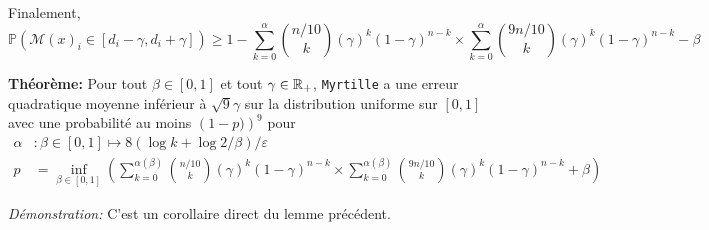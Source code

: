 Finalement,
\[
    \mathbb P\left(  \mathcal M(x)_i \in [d_i - \gamma, d_i + \gamma] \right) \geq 1 - \sum_{k = 0}^{\alpha} \binom{n/10}{k}\left( \gamma \right)^k (1 - \gamma)^{n-k} \times \sum_{k = 0}^{\alpha} \binom{9n/10}{k}\left( \gamma \right)^k (1 - \gamma)^{n-k} - \beta  
\]


\vspace*{5pt}
\textbf{Théorème: } Pour tout \(\beta \in [0,1]\) et tout \(\gamma \in \mathbb{R}_+\), \texttt{Myrtille} a une erreur quadratique moyenne inférieur à \(\sqrt{9}\gamma\) sur la distribution uniforme sur \([0,1]\) avec une probabilité au moins \(\left( 1 - p) \right)^9\) pour 
\begin{align*}
    \alpha & : \beta \in [0,1] \mapsto  8\left( \log k + \log 2/\beta \right)/\varepsilon\\
    p & = \inf_{\beta \in [0,1]}\left( \sum_{k = 0}^{\alpha(\beta)} \binom{n/10}{k}\left( \gamma \right)^k (1 - \gamma)^{n-k} \times \sum_{k = 0}^{\alpha(\beta)} \binom{9n/10}{k}\left( \gamma \right)^k (1 - \gamma)^{n-k} + \beta \right)
\end{align*}

\textit{Démonstration:} C'est un corollaire direct du lemme précédent. 


